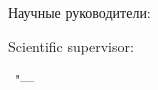 %
\vspace{0pt plus4fill} %
\begin{flushright}
\ifdefined\supervisorTwoFio
Научные руководители:

\supervisorRegalia

\ifdefined\supervisorDead
\framebox{\supervisorFio}
\else
\supervisorFio
\fi

\supervisorTwoRegalia

\ifdefined\supervisorTwoDead
\framebox{\supervisorTwoFio}
\else
\supervisorTwoFio
\fi
\else
Scientific supervisor:

\supervisorRegalia

\ifdefined\supervisorDead
\framebox{\supervisorFio}
\else
\supervisorFio
\fi
\fi

\end{flushright}
%
\vspace{0pt plus4fill} %
{\centering\thesisCity\ "--- \thesisYear\par}
